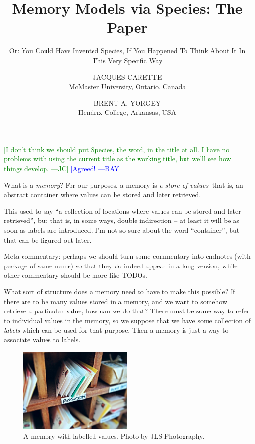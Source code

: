 \documentclass{jfp}
\title{Memory Models via Species: The Paper}
\subtitle{Or: You Could Have Invented Species, If You Happened To Think
  About It In This Very Specific Way}
\author[J. Carette and B. A. Yorgey]{JACQUES CARETTE\\
  McMaster University, Ontario, Canada \\
  \email{carette@mcmaster.ca}
  \and BRENT A. YORGEY\\
  Hendrix College, Arkansas, USA\\
  \email{yorgey@hendrix.edu}}
\newcommand{\term}[1]{\emph{#1}}
\newcommand{\authornote}[3]{\textcolor{#1}{[#3 ---#2]}}
\newcommand{\authornote}[3]{}
\newcommand{\bay}[1]{\authornote{blue}{BAY}{#1}}
\newcommand{\jc}[1]{\authornote{green}{JC}{#1}}  %
\begin{document}
\maketitle

\jc{I don't think we should put Species, the word,
  in the title at all. I have no problems with using the current
  title as the working title, but we'll see how things develop.}
\bay{Agreed!}

What is a \term{memory}?  For our purposes, a memory is \emph{a store
  of values}, that is, an abstract container where values can be
stored and later retrieved.

\begin{commentary}
  This used to say ``a collection of locations where
values can be stored and later retrieved'', but that is, in some
ways, double indirection -- at least it will be as soon as labels
are introduced.  I'm not so sure about the word ``container'', but
that can be figured out later.
\end{commentary}

\begin{commentary}
Meta-commentary: perhaps we should turn some commentary into
endnotes (with package of same name) so that they do indeed appear
in a long version, while other commentary should be more like
TODOs.
\end{commentary}

What sort of structure does a memory need to have to make this
possible?  If there are to be many values stored in a memory, and we
want to somehow retrieve a particular value, how can we do that?
There must be some way to refer to individual values in the memory, so
we suppose that we have some collection of \emph{labels} which can be
used for that purpose. Then a memory is just a way to associate
values to labels.

\begin{figure}[htp]
  \centering
  \includegraphics[width=0.5\textwidth]{mailboxes.jpg}
  \caption{A memory with labelled values. Photo by JLS Photography.\protect\footnotemark}
  \label{fig:mailboxes}
\end{figure}
\end{document}
